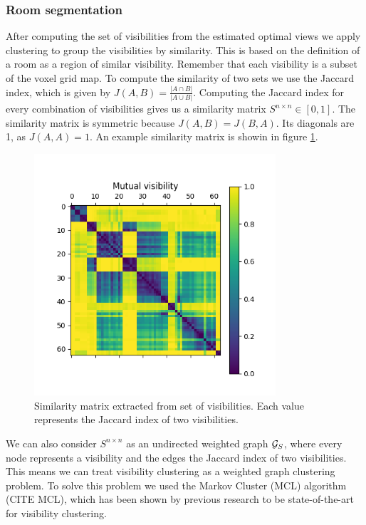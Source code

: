 \subsubsection{Room segmentation}
After computing the set of visibilities from the estimated optimal views we apply clustering to group the visibilities by similarity. This is based on the definition of a room as a region of similar visibility. Remember that each visibility is a subset of the voxel grid map. To compute the similarity of two sets we use the Jaccard index, which is given by \(J(A,B) = \frac{|A \cap B|}{|A \cup B|}\). Computing the Jaccard index for every combination of visibilities gives us a similarity matrix \(S^{n \times n} \in [0, 1]\). The similarity matrix is symmetric because \(J(A,B) = J(B,A)\). Its diagonals are 1, as \(J(A,A) = 1\). An example similarity matrix is showin in figure \ref{fig:jaccard}.

\begin{figure}
    \centering
    \includegraphics*[width=0.8\textwidth]{./fig/mutual_visibility_matrix.png}
    \caption{Similarity matrix extracted from set of visibilities. Each value represents the Jaccard index of two visibilities.}
    \label{fig:jaccard}
\end{figure}

We can also consider \(S^{n \times n}\) as an undirected weighted graph \(\mathcal{G}_S\), where every node represents a visibility and the edges the Jaccard index of two visibilities. This means we can treat visibility clustering as a weighted graph clustering problem. To solve this problem we used the Markov Cluster (MCL) algorithm (CITE MCL), which has been shown by previous research to be state-of-the-art for visibility clustering. 


